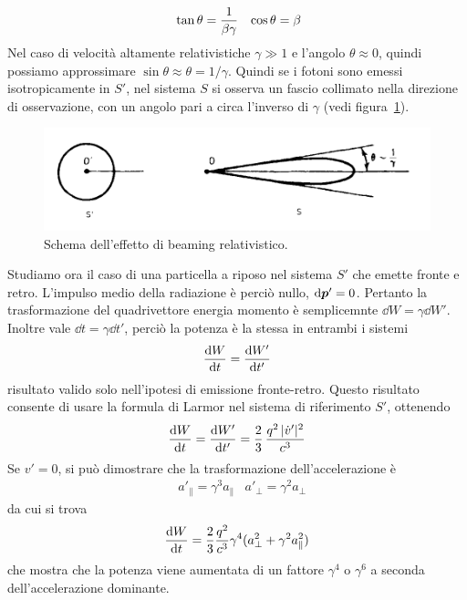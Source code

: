 \begin{align}
&\tan \theta = \dfrac{1}{\beta\gamma}
&\cos\theta = \beta
\end{align}
Nel caso di velocità altamente relativistiche $\gamma\gg 1$ e l'angolo $\theta\approx 0$, quindi possiamo approssimare $\sin\theta \approx \theta=1/\gamma$. Quindi se i fotoni sono emessi isotropicamente in $S'$, nel sistema $S$ si osserva un fascio collimato nella direzione di osservazione, con un angolo pari a circa l'inverso di $\gamma$ (vedi figura~\ref{fig:Beaming}).
\begin{figure}
\includegraphics[width=\textwidth]{img/Beaming}
\caption{Schema dell'effetto di beaming relativistico.} \label{fig:Beaming}
\end{figure}

Studiamo ora il caso di una particella a riposo nel sistema $S'$ che emette fronte e retro. L'impulso medio della radiazione è perciò nullo, $\dd \V{p}'=0$. Pertanto la trasformazione del quadrivettore energia momento è semplicemnte $\dd W = \gamma \dd W'$. Inoltre vale $\dd t = \gamma \dd t'$, perciò la potenza è la stessa in entrambi i sistemi
\begin{equation}
\dfrac{\mathrm{d} {W}}{\mathrm{d} {t}} = \dfrac{\mathrm{d} {W'}}{\mathrm{d} {t'}} \label{eq:PotenzaInvariante}
\end{equation}
risultato valido solo nell'ipotesi di emissione fronte-retro. Questo risultato consente di usare la formula di Larmor nel sistema di riferimento $S'$, ottenendo
\begin{equation}
\dfrac{\mathrm{d} {W}}{\mathrm{d} {t}} = \dfrac{\mathrm{d} {W'}}{\mathrm{d} {t'}} = \dfrac{2}{3}\, \dfrac{q^2\, |\dot{v}'|^2}{c^3}
\end{equation}
Se $v'=0$, si può dimostrare che la trasformazione dell'accelerazione è 
\begin{align}
&a'_\| = \gamma^3 a_\|
&a'_\bot=\gamma^2 a_\bot
\end{align}
da cui si trova 
\begin{equation}
\dfrac{\mathrm{d} {W}}{\mathrm{d} {t}} = \dfrac{2}{3} \dfrac{q^2}{c^3} \gamma^4 (a^2_\bot + \gamma^2 a^2_\|) \label{eq:Relatività2}
\end{equation}
che mostra che la potenza viene aumentata di un fattore $\gamma^4$ o $\gamma^6$ a seconda dell'accelerazione dominante.

